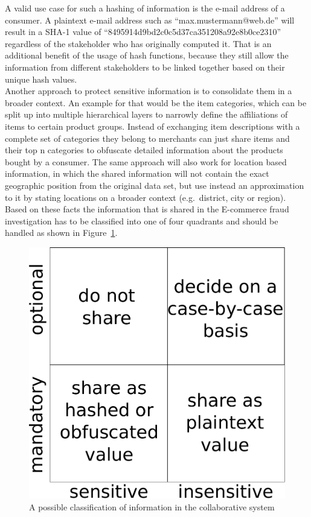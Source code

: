 A valid use case for such a hashing of information is the e-mail address of a consumer. A plaintext e-mail address such as ``max.mustermann@web.de'' will result in a \gls{SHA-1} value of ``8495914d9bd2c0c5d37ca351208a92e8b0ce2310'' regardless of the stakeholder who has originally computed it. That is an additional benefit of the usage of hash functions, because they still allow the information from different stakeholders to be linked together based on their unique hash values. \\

Another approach to protect sensitive information is to consolidate them in a broader context. An example for that would be the item categories, which can be split up into multiple hierarchical layers to narrowly define the affiliations of items to certain product groups. Instead of exchanging item descriptions with a complete set of categories they belong to merchants can just share items and their top n categories to obfuscate detailed information about the products bought by a consumer. The same approach will also work for location based information, in which the shared information will not contain the exact geographic position from the original data set, but use instead an approximation to it by stating locations on a broader context (e.g.\ district, city or region). \\  

Based on these facts the information that is shared in the \gls{E-commerce} fraud investigation has to be classified into one of four quadrants and should be handled as shown in Figure~\ref{fig:images_handle_privacy_concerns}. \@

\begin{figure}[H]
	\centering
		\includegraphics[width=0.5\columnwidth]{images/privacy_concerns.pdf}
	\caption{A possible classification of information in the collaborative system}
\label{fig:images_handle_privacy_concerns}
\end{figure}


